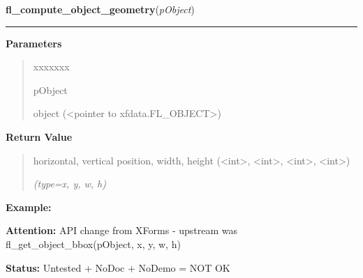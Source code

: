 \hspace{.8\funcindent}\begin{boxedminipage}{\funcwidth}

    \raggedright \textbf{fl\_compute\_object\_geometry}(\textit{pObject})

    \vspace{-1.5ex}

    \rule{\textwidth}{0.5\fboxrule}
\setlength{\parskip}{2ex}
\setlength{\parskip}{1ex}
      \textbf{Parameters}
      \vspace{-1ex}

      \begin{quote}
        \begin{Ventry}{xxxxxxx}

          \item[pObject]

          object ({\textless}pointer to xfdata.FL\_OBJECT{\textgreater})

        \end{Ventry}

      \end{quote}

      \textbf{Return Value}
    \vspace{-1ex}

      \begin{quote}
      horizontal, vertical position, width, height 
      ({\textless}int{\textgreater}, {\textless}int{\textgreater}, 
      {\textless}int{\textgreater}, {\textless}int{\textgreater})

      {\it (type=x, y, w, h)}

      \end{quote}

\textbf{Example:} 

\textbf{Attention:} API change from XForms - upstream was fl\_get\_object\_bbox(pObject, x, y, 
w, h)



\textbf{Status:} Untested + NoDoc + NoDemo = NOT OK



    \end{boxedminipage}

    \label{xformslib:library:fl_call_object_callback}

    \vspace{0.5ex}

